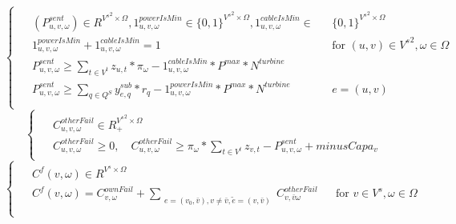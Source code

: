 \documentclass[a4paper,12pt]{article}
\begin{document}
    \begin{equation}
        \begin{cases}
            \begin{alignedat}{2}
                & (P_{u,v,\omega}^{sent}) \in R^{{V^s}^2 \times \Omega}, 1_{u,v,\omega}^{powerIsMin} \in \{0,1\}^{{V^{s}}^2 \times \Omega},  1_{u,v,\omega}^{cableIsMin} \in && \{0,1\}^{{V^{s}}^2 \times \Omega} \\
                & 1_{u,v,\omega}^{powerIsMin} + 1_{u,v,\omega}^{cableIsMin} = 1 && \text{for } (u,v) \in {V^s}^2, \omega \in \Omega \\
                & P_{u,v,\omega}^{sent} \geq \sum_{t \in V^t} z_{u,t} * \pi_\omega - 1_{u,v,\omega}^{cableIsMin} * P^{max} * N^{turbine} \\
                & P_{u, v, \omega}^{sent} \geq  \sum_{q \in Q^S} y_{e,q}^{sub} * r_q - 1_{u, v, \omega}^{powerIsMin} * P^{max} * N^{turbine} && e = (u, v) \\
            \end{alignedat}
        \end{cases}
    \end{equation}
    \begin{equation}
        \begin{cases}
            \begin{alignedat}{2}
                & C_{u, v, \omega}^{otherFail} \in R^{{V^s}^2 \times \Omega}_+ \\
                & C_{u, v, \omega}^{otherFail} \geq 0, \quad C_{u, v, \omega}^{otherFail} \geq \pi_\omega * \sum_{t \in V^t} z_{v,t} - P_{u, v, \omega}^{sent} + minusCapa_v
            \end{alignedat}
        \end{cases}
    \end{equation}
    \begin{equation}
        \begin{cases}
            \begin{alignedat}{2}
                & C^f(v, \omega) \in R^{V^s \times \Omega} && \\
                & C^f(v, \omega) = C_{v, \omega}^{ownFail} + \sum_{\substack{e = (v_0, \bar{v}), v \neq \bar{v}, \tilde{e} = (v, \bar{v})}} C_{v, \bar{v} \omega}^{otherFail} && \text{for } v \in V^s, \omega \in \Omega \\
            \end{alignedat}
        \end{cases}
    \end{equation}
\end{document}
